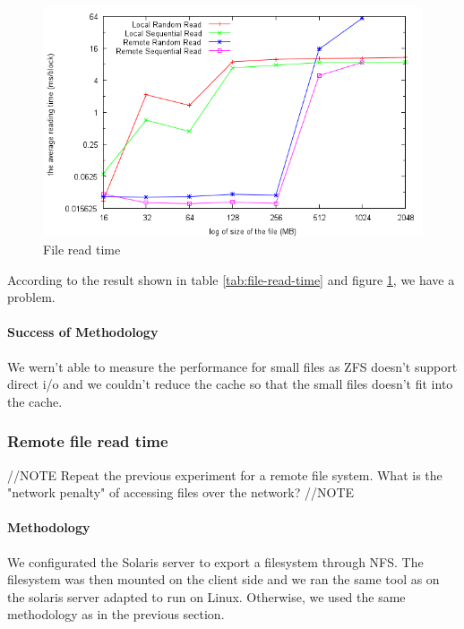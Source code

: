 \begin{figure}[h]
\begin{center}
\includegraphics[scale=0.8]{fileAccessImage}
\end{center}
\caption {File read time\label{fig:file-access}}
\end{figure}


According to the result shown in table \ref{tab:file-read-time} and figure
\ref{fig:file-access}, we have a problem.


\paragraph{Success of Methodology}
We wern't able to measure the performance for small files as ZFS doesn't support
direct i/o and we couldn't reduce the cache so that the small files doesn't fit
into the cache.




\subsubsection{Remote file read time}
//NOTE
Repeat the previous experiment for a remote file system. What is the "network penalty" of accessing files over the network?
//NOTE

\paragraph{Methodology}
We configurated the Solaris server to export a filesystem through NFS.
The filesystem was then mounted on the client side and we ran the same tool as
on the solaris server adapted to run on Linux.
Otherwise, we used the same methodology as in the previous section.

